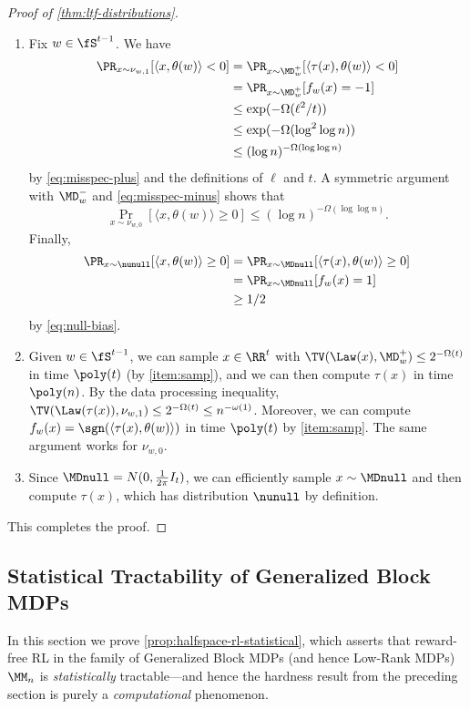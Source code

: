\begin{proof}[Proof of \cref{thm:ltf-distributions}]
\begin{enumerate}
\item Fix $w \in \fS^{t-1}$. We have
\begin{align*}
\Pr_{x \sim \nu_{w,1}}[\langle x,\theta(w)\rangle < 0]
&= \Pr_{x \sim \MD_w^+}[\langle \tau(x), \theta(w)\rangle < 0] \\ 
&= \Pr_{x \sim \MD_w^+}[f_w(x) = -1] \\ 
&\leq \exp(-\Omega(\ell^2/t)) \\ 
&\leq \exp(-\Omega(\log^2 \log n)) \\
&\leq (\log n)^{-\Omega(\log \log n)}
\end{align*}
by \cref{eq:misspec-plus} and the definitions of $\ell$ and $t$. A symmetric argument with $\MD_w^-$ and \cref{eq:misspec-minus} shows that
\[\Pr_{x \sim \nu_{w,0}}[\langle x,\theta(w) \rangle \geq 0] \leq (\log n)^{-\Omega(\log \log n)}.\]
Finally,
\begin{align*}
\Pr_{x \sim \nunull}[\langle x,\theta(w)\rangle \geq 0]
&= \Pr_{x \sim \MDnull}[\langle \tau(x), \theta(w)\rangle \geq 0] \\ 
&= \Pr_{x \sim \MDnull}[f_w(x) = 1] \\ 
&\geq 1/2
\end{align*}
by \cref{eq:null-bias}.

\item Given $w \in \fS^{t-1}$, we can sample $x \in \RR^t$ with $\TV(\Law(x),\MD_w^+) \leq 2^{-\Omega(t)}$ in time $\poly(t)$ (by \cref{item:samp}), and we can then compute $\tau(x)$ in time $\poly(n)$. By the data processing inequality, $\TV(\Law(\tau(x)), \nu_{w,1}) \leq 2^{-\Omega(t)} \leq n^{-\omega(1)}$. Moreover, we can compute $f_w(x) = \sgn(\langle \tau(x),\theta(w)\rangle)$ in time $\poly(t)$ by \cref{item:samp}. The same argument works for $\nu_{w,0}$.

\item Since $\MDnull = N(0,\frac{1}{2\pi}I_t)$, we can efficiently sample $x \sim \MDnull$ and then compute $\tau(x)$, which has distribution $\nunull$ by definition.
\end{enumerate}
This completes the proof.
\end{proof}

\subsection{Statistical Tractability of Generalized Block MDPs}\label{sec:halfspace-statistical}

In this section we prove \cref{prop:halfspace-rl-statistical}, which asserts that reward-free RL in the family of Generalized Block MDPs (and hence Low-Rank MDPs) $\MM_n$ is \emph{statistically} tractable---and hence the hardness result from the preceding section is purely a \emph{computational} phenomenon. 

